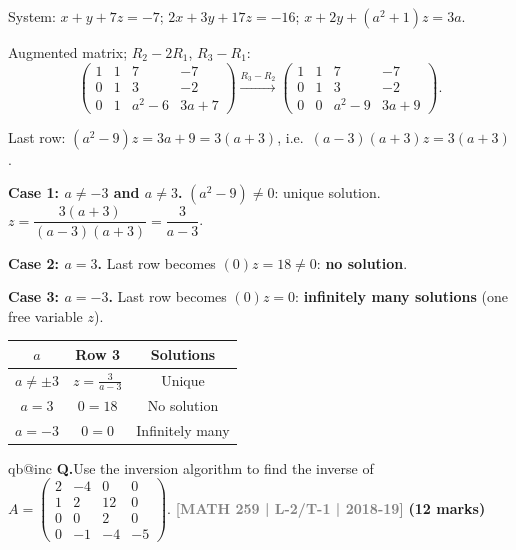 \documentclass[12pt,a3paper]{article}
\makeatletter
\newcommand{\yr}[1]{\hfill\textcolor{gray}{\small\textbf{[#1]}}}
\newcommand{\mk}[1]{\textcolor{orange!70!black}{\small\textbf{(#1 marks)}}}
\newcounter{qnum}
\newcommand{\Q}[1]{%
  \csname qb@inc\endcsname
  \needspace{4\baselineskip}
  \refstepcounter{qnum}
  \vspace{6pt}
  \noindent\textbf{Q\theqnum.}\enspace #1\par
}
\makeatother
\begin{document}
\begin{tcolorbox}[enhanced,breakable,
  colback=cB!4,colframe=cB,boxrule=0.8pt,arc=5pt,
  title={\textbf{Answer --- Values of $a$: No/Unique/Infinitely Many Solutions}},
  fonttitle=\bfseries\color{white},colbacktitle=cB]

System: $x+y+7z=-7$;\; $2x+3y+17z=-16$;\; $x+2y+(a^2+1)z=3a$.

Augmented matrix; $R_2-2R_1$, $R_3-R_1$:
\[
\begin{pmatrix}1&1&7&-7\\0&1&3&-2\\0&1&a^2-6&3a+7\end{pmatrix}
\xrightarrow{R_3-R_2}
\begin{pmatrix}1&1&7&-7\\0&1&3&-2\\0&0&a^2-9&3a+9\end{pmatrix}.
\]

Last row: $(a^2-9)z = 3a+9 = 3(a+3)$, i.e.\ $(a-3)(a+3)z = 3(a+3)$.

\textbf{Case 1: $a\neq-3$ and $a\neq3$.} $(a^2-9)\neq0$: unique solution. $z=\dfrac{3(a+3)}{(a-3)(a+3)}=\dfrac{3}{a-3}$.

\textbf{Case 2: $a=3$.} Last row becomes $(0)z=18\neq0$: \textbf{no solution}.

\textbf{Case 3: $a=-3$.} Last row becomes $(0)z=0$: \textbf{infinitely many solutions} (one free variable $z$).

\begin{center}
\small\begin{tabular}{@{}ccc@{}}
\toprule
$a$ & Row 3 & Solutions \\
\midrule
$a\neq\pm3$ & $z=\frac{3}{a-3}$ & Unique \\
$a=3$  & $0=18$ & No solution \\
$a=-3$ & $0=0$  & Infinitely many \\
\bottomrule
\end{tabular}
\end{center}

\end{tcolorbox}


\Q{Use the inversion algorithm to find the inverse of $A = \begin{pmatrix} 2 & -4 & 0 & 0 \\ 1 & 2 & 12 & 0 \\ 0 & 0 & 2 & 0 \\ 0 & -1 & -4 & -5 \end{pmatrix}$.
\yr{MATH 259 | L-2/T-1 | 2018-19} \mk{12}}
\end{document}

